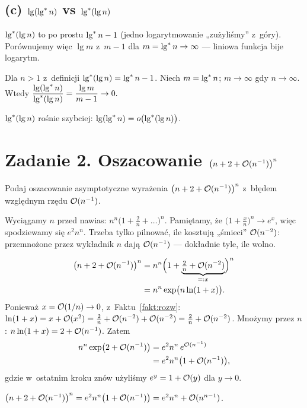 \documentclass[11pt]{article}
\begin{document}
\subsection*{(c) $\operatorname{lg}(\operatorname{lg}^{*} n)$ vs $\operatorname{lg}^{*}(\operatorname{lg} n)$}
\begin{intuicja}
$\operatorname{lg}^{*}(\operatorname{lg} n)$ to po prostu $\operatorname{lg}^{*} n - 1$ (jedno logarytmowanie „zużyliśmy”
z~góry). Porównujemy więc $\lg m$ z~$m-1$ dla $m=\operatorname{lg}^{*} n\to\infty$ --- liniowa
funkcja bije logarytm.
\end{intuicja}
\formalnie
Dla $n>1$ z~definicji $\operatorname{lg}^{*}(\operatorname{lg} n)=\operatorname{lg}^{*} n-1$. Niech $m=\operatorname{lg}^{*} n$; $m\to\infty$
gdy $n\to\infty$. Wtedy
$\dfrac{\operatorname{lg}(\operatorname{lg}^{*} n)}{\operatorname{lg}^{*}(\operatorname{lg} n)} = \dfrac{\operatorname{lg} m}{m-1}\to 0.$
\begin{odpowiedz}
$\operatorname{lg}^{*}(\operatorname{lg} n)$ rośnie szybciej: $\operatorname{lg}(\operatorname{lg}^{*} n) = o\bigl(\operatorname{lg}^{*}(\operatorname{lg} n)\bigr)$.
\end{odpowiedz}

\section{Zadanie 2. Oszacowanie \texorpdfstring{$\bigl(n+2+\mathcal{O}(n^{-1})\bigr)^n$}{(n+2+O(1/n))\textasciicircum n}}
\begin{tresc}
Podaj oszacowanie asymptotyczne wyrażenia $\bigl(n+2+\mathcal{O}(n^{-1})\bigr)^n$
z~błędem względnym rzędu $\mathcal{O}(n^{-1})$.
\end{tresc}

\begin{intuicja}
Wyciągamy $n$ przed nawias: $n^n\bigl(1+\frac2n+\dots\bigr)^n$. Pamiętamy, że
$\bigl(1+\frac xn\bigr)^n\to e^x$, więc spodziewamy się $e^2 n^n$. Trzeba
tylko pilnować, ile kosztują „śmieci” $\mathcal{O}(n^{-2})$: przemnożone przez
wykładnik $n$ dają $\mathcal{O}(n^{-1})$ --- dokładnie tyle, ile wolno.
\end{intuicja}
\formalnie
\begin{align*}
\bigl(n+2+\mathcal{O}(n^{-1})\bigr)^n &= n^n\Bigl(1+\underbrace{\tfrac2n+\mathcal{O}(n^{-2})}_{=:x}\Bigr)^n\\
&= n^n \exp\bigl(n\ln(1+x)\bigr).
\end{align*}
Ponieważ $x=\mathcal{O}(1/n)\to0$, z~Faktu~\ref{fakt:rozw}:
$\ln(1+x) = x+\mathcal{O}(x^2) = \tfrac2n + \mathcal{O}(n^{-2}) + \mathcal{O}(n^{-2}) = \tfrac2n+\mathcal{O}(n^{-2})$.
Mnożymy przez $n$: $n\ln(1+x) = 2+\mathcal{O}(n^{-1})$. Zatem
\begin{align*}
n^n\exp\bigl(2+\mathcal{O}(n^{-1})\bigr) &= e^2n^n\, e^{\mathcal{O}(n^{-1})}\\
&= e^2 n^n\bigl(1+\mathcal{O}(n^{-1})\bigr),
\end{align*}
gdzie w~ostatnim kroku znów użyliśmy $e^y=1+\mathcal{O}(y)$ dla $y\to0$.
\begin{odpowiedz}
$\bigl(n+2+\mathcal{O}(n^{-1})\bigr)^n = e^2 n^n\bigl(1+\mathcal{O}(n^{-1})\bigr) = e^2n^n+\mathcal{O}(n^{n-1})$.
\end{odpowiedz}
\end{document}
